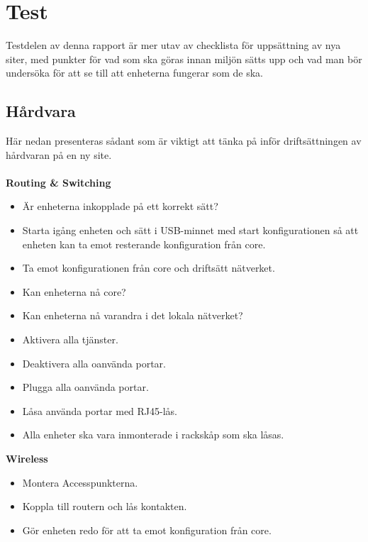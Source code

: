 \section{Test}
Testdelen av denna rapport är mer utav av checklista för uppsättning av nya siter, med punkter för vad som ska göras innan miljön sätts upp och vad man bör undersöka för att se till att enheterna fungerar som de ska.

\subsection{Hårdvara}
Här nedan presenteras sådant som är viktigt att tänka på inför driftsättningen av hårdvaran på en ny site. \\
\\
\textbf{Routing \& Switching}
\begin{itemize}[noitemsep]
    \item Är enheterna inkopplade på ett korrekt sätt?
    \item Starta igång enheten och sätt i USB-minnet med start konfigurationen så att enheten kan ta emot resterande konfiguration från core.
    \item Ta emot konfigurationen från core och driftsätt nätverket.
    \item Kan enheterna nå core?
    \item Kan enheterna nå varandra i det lokala nätverket?
    \item Aktivera alla tjänster.
    \item Deaktivera alla oanvända portar.
    \item Plugga alla oanvända portar.
    \item Låsa använda portar med RJ45-lås.
    \item Alla enheter ska vara inmonterade i rackskåp som ska låsas.
\end{itemize}

\noindent \textbf{Wireless}
\begin{itemize}[noitemsep]
    \item Montera Accesspunkterna.
    \item Koppla till routern och lås kontakten.
    \item Gör enheten redo för att ta emot konfiguration från core.
\end{itemize}

